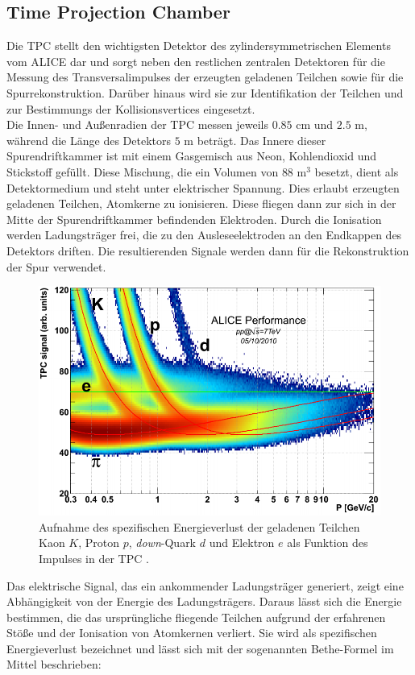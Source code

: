 \documentclass[12pt,a4paper]{report}
\begin{document}
\subsection{Time Projection Chamber}
Die TPC stellt den wichtigsten Detektor des zylindersymmetrischen Elements vom ALICE dar und sorgt neben den restlichen zentralen Detektoren für die Messung des Transversalimpulses der erzeugten geladenen Teilchen sowie für die Spurrekonstruktion. Darüber hinaus wird sie zur Identifikation der Teilchen und zur Bestimmungs der Kollisionsvertices eingesetzt.\\
Die Innen- und Außenradien der TPC messen jeweils $0.85$ cm und $2.5$ m, während die Länge des Detektors $5$ m beträgt. Das Innere dieser Spurendriftkammer ist mit einem Gasgemisch aus Neon, Kohlendioxid und Stickstoff gefüllt. Diese Mischung, die ein Volumen von $88$ $\mathrm{m^3}$ besetzt, dient als Detektormedium und steht unter elektrischer Spannung. Dies erlaubt erzeugten geladenen Teilchen, Atomkerne zu ionisieren. Diese fliegen dann zur sich in der Mitte der Spurendriftkammer befindenden Elektroden. Durch die Ionisation werden Ladungsträger frei, die zu den Ausleseelektroden an den Endkappen des Detektors driften. Die resultierenden Signale werden dann für die Rekonstruktion der Spur verwendet.\\
\begin{figure}[tb!]
\centering
\includegraphics[width=13cm]{EnergieverlustTPC.png} 
\caption{Aufnahme des spezifischen Energieverlust der geladenen Teilchen Kaon $K$, Proton $p$, \textit{down}-Quark $d$ und Elektron $e$ als Funktion des Impulses in der TPC \cite{PHUHN17}.}
\label{EnergieverlustTPC}
\end{figure}
\hspace{-0.206cm}Das elektrische Signal, das ein ankommender Ladungsträger generiert, zeigt eine Abhängigkeit von der Energie des Ladungsträgers. Daraus lässt sich die Energie bestimmen, die das ursprüngliche fliegende Teilchen aufgrund der erfahrenen Stöße und der Ionisation von Atomkernen verliert. Sie wird als spezifischen Energieverlust bezeichnet und lässt sich mit der sogenannten Bethe-Formel im Mittel beschrieben:
\end{document}
